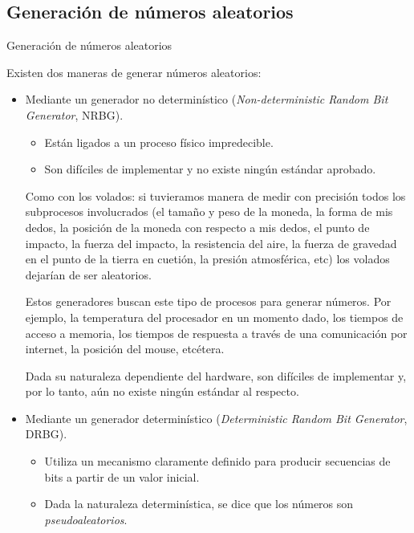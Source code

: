 %
%
%

\subsection{Generación de números aleatorios}

\begin{frame}{Generación de números aleatorios}

  Existen dos maneras de generar números aleatorios:

  \begin{itemize}

    \item<2-> Mediante un generador no determinístico (\textit{Non-deterministic
      Random Bit Generator}, NRBG).

      \begin{itemize}
        \item Están ligados a un proceso físico impredecible.
        \item Son difíciles de implementar y no existe ningún estándar
          aprobado.
      \end{itemize}

    {
      Como con los volados: si tuvieramos manera de medir con precisión todos
      los subprocesos involucrados (el tamaño y peso de la moneda, la forma de
      mis dedos, la posición de la moneda con respecto a mis dedos, el punto de
      impacto, la fuerza del impacto, la resistencia del aire, la fuerza de
      gravedad en el punto de la tierra en cuetión, la presión atmosférica, etc)
      los volados dejarían de ser aleatorios.

      Estos generadores buscan este tipo de procesos para generar números. Por
      ejemplo, la temperatura del procesador en un momento dado, los tiempos de
      acceso a memoria, los tiempos de respuesta a través de una comunicación
      por internet, la posición del mouse, etcétera.
    
      Dada su naturaleza dependiente del hardware, son difíciles de implementar
      y, por lo tanto, aún no existe ningún estándar al respecto.
    }

    \item<3-> Mediante un generador determinístico (\textit{Deterministic
      Random Bit Generator}, DRBG).

      \begin{itemize}
        \item Utiliza un mecanismo claramente definido para producir
          secuencias de bits a partir de un valor inicial.
        \item Dada la naturaleza determinística, se dice que los números son
          \textit{pseudoaleatorios}.
      \end{itemize}


\end{itemize}
\end{frame}
